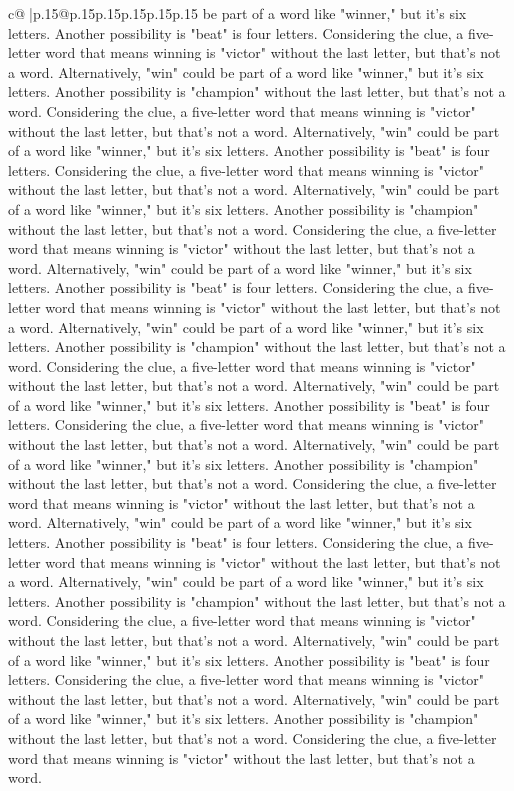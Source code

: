 \documentclass{article}
\begin{document}
{\begin{supertabular}{c@{$\;$}|p{.15\linewidth}@{}p{.15\linewidth}p{.15\linewidth}p{.15\linewidth}p{.15\linewidth}p{.15\linewidth}}
{{{be part of a word like "winner," but it's six letters. Another possibility is "beat" is four letters. Considering the clue, a five{-}letter word that means winning is "victor" without the last letter, but that's not a word. Alternatively, "win" could be part of a word like "winner," but it's six letters. Another possibility is "champion" without the last letter, but that's not a word. Considering the clue, a five{-}letter word that means winning is "victor" without the last letter, but that's not a word. Alternatively, "win" could be part of a word like "winner," but it's six letters. Another possibility is "beat" is four letters. Considering the clue, a five{-}letter word that means winning is "victor" without the last letter, but that's not a word. Alternatively, "win" could be part of a word like "winner," but it's six letters. Another possibility is "champion" without the last letter, but that's not a word. Considering the clue, a five{-}letter word that means winning is "victor" without the last letter, but that's not a word. Alternatively, "win" could be part of a word like "winner," but it's six letters. Another possibility is "beat" is four letters. Considering the clue, a five{-}letter word that means winning is "victor" without the last letter, but that's not a word. Alternatively, "win" could be part of a word like "winner," but it's six letters. Another possibility is "champion" without the last letter, but that's not a word. Considering the clue, a five{-}letter word that means winning is "victor" without the last letter, but that's not a word. Alternatively, "win" could be part of a word like "winner," but it's six letters. Another possibility is "beat" is four letters. Considering the clue, a five{-}letter word that means winning is "victor" without the last letter, but that's not a word. Alternatively, "win" could be part of a word like "winner," but it's six letters. Another possibility is "champion" without the last letter, but that's not a word. Considering the clue, a five{-}letter word that means winning is "victor" without the last letter, but that's not a word. Alternatively, "win" could be part of a word like "winner," but it's six letters. Another possibility is "beat" is four letters. Considering the clue, a five{-}letter word that means winning is "victor" without the last letter, but that's not a word. Alternatively, "win" could be part of a word like "winner," but it's six letters. Another possibility is "champion" without the last letter, but that's not a word. Considering the clue, a five{-}letter word that means winning is "victor" without the last letter, but that's not a word. Alternatively, "win" could be part of a word like "winner," but it's six letters. Another possibility is "beat" is four letters. Considering the clue, a five{-}letter word that means winning is "victor" without the last letter, but that's not a word. Alternatively, "win" could be part of a word like "winner," but it's six letters. Another possibility is "champion" without the last letter, but that's not a word. Considering the clue, a five{-}letter word that means winning is "victor" without the last letter, but that's not a word. }}}
\end{supertabular}}
\end{document}
